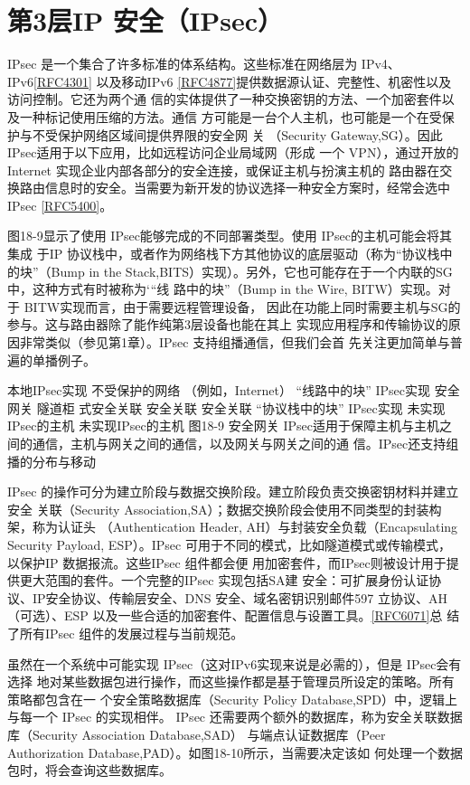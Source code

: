 \section{第3层IP 安全（IPsec）}

IPsec 是一个集合了许多标准的体系结构。这些标准在网络层为 IPv4、IPv6\href{https://www.rfc-editor.org/rfc/rfc4301}{[RFC4301]}
以及移动IPv6 \href{https://www.rfc-editor.org/rfc/rfc4877}{[RFC4877]}提供数据源认证、完整性、机密性以及访问控制。它还为两个通
信的实体提供了一种交换密钥的方法、一个加密套件以及一种标记使用压缩的方法。通信
方可能是一台个人主机，也可能是一个在受保护与不受保护网络区域间提供界限的安全网
关 （Security Gateway,SG）。因此IPsec适用于以下应用，比如远程访问企业局域网（形成
一个 VPN），通过开放的Internet 实现企业内部各部分的安全连接，或保证主机与扮演主机的
路由器在交换路由信息时的安全。当需要为新开发的协议选择一种安全方案时，经常会选中
IPsec \href{https://www.rfc-editor.org/rfc/rfc5400}{[RFC5400]}。

图18-9显示了使用 IPsec能够完成的不同部署类型。使用 IPsec的主机可能会将其集成
于IP 协议栈中，或者作为网络栈下方其他协议的底层驱动（称为“协议栈中的块”（Bump in
the Stack,BITS）实现）。另外，它也可能存在于一个内联的SG 中，这种方式有时被称为‘“线
路中的块”（Bump in the Wire, BITW）实现。对于 BITW实现而言，由于需要远程管理设备，
因此在功能上同时需要主机与SG的参与。这与路由器除了能作纯第3层设备也能在其上
实现应用程序和传输协议的原因非常类似（参见第1章）。IPsec 支持组播通信，但我们会首
先关注更加简单与普遍的单播例子。

本地IPsec实现
不受保护的网络
（例如，Internet）
“线路中的块”
IPsec实现
安全网关
隧道柜
式安全关联
安全关联
安全关联
“协议栈中的块”
IPsec实现
未实现IPsec的主机
未实现IPsec的主机
图18-9
安全网关
IPsec适用于保障主机与主机之间的通信，主机与网关之间的通信，以及网关与网关之间的通
信。IPsec还支持组播的分布与移动

IPsec 的操作可分为建立阶段与数据交换阶段。建立阶段负责交换密钥材料并建立安全
关联（Security Association,SA）；数据交换阶段会使用不同类型的封装构架，称为认证头
（Authentication Header, AH）与封装安全负载（Encapsulating Security Payload, ESP）。IPsec
可用于不同的模式，比如隧道模式或传输模式，以保护IP 数据报流。这些IPsec 组件都会便
用加密套件，而IPsec则被设计用于提供更大范围的套件。一个完整的IPsec 实现包括SA建
安全：可扩展身份认证协议、IP安全协议、传輸层安全、DNS 安全、域名密钥识别邮件597
立协议、AH（可选）、ESP 以及一些合适的加密套件、配置信息与设置工具。\href{https://www.rfc-editor.org/rfc/rfc6071}{[RFC6071]}总
结了所有IPsec 组件的发展过程与当前规范。

虽然在一个系统中可能实现 IPsec（这对IPv6实现来说是必需的），但是 IPsec会有选择
地对某些数据包进行操作，而这些操作都是基于管理员所设定的策略。所有策略都包含在一
个安全策略数据库（Security Policy Database,SPD）中，逻辑上与每一个 IPsec 的实现相伴。
IPsec 还需要两个额外的数据库，称为安全关联数据库（Security Association Database,SAD）
与端点认证数据库（Peer Authorization Database,PAD）。如图18-10所示，当需要决定该如
何处理一个数据包时，将会查询这些数据库。

